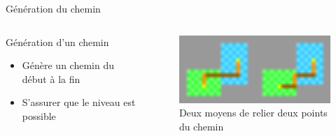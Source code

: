 \documentclass{beamer}
\begin{document}
{\begin{frame}{Génération du chemin}
    \begin{columns}
        \begin{block}{Génération d'un chemin}
            \begin{itemize}
                \item[\bullet] Génère un chemin du début à la fin
                \item[\bullet] S'assurer que le niveau est possible
            \end{itemize}
        \end{block}
        \begin{figure}
            \centering
            \includegraphics[width=1.0\textwidth]{images/two_ways_to_connect}
            \caption{Deux moyens de relier deux points du chemin}
        \end{figure}
    \end{columns}
\end{frame}

}
\end{document}
